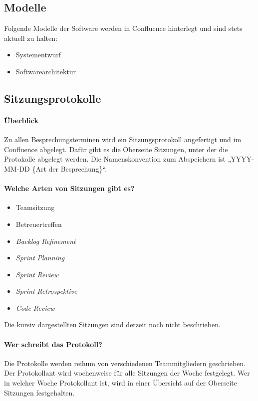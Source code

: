 \subsection{Modelle}
Folgende Modelle der Software werden in Confluence hinterlegt und sind stets aktuell zu halten:
\begin{itemize}
	\item Systementwurf
	\item Softwarearchitektur
\end{itemize}

\subsection{Sitzungsprotokolle}
\paragraph{Überblick}
Zu allen Besprechungsterminen wird ein Sitzungsprotokoll angefertigt und im Confluence abgelegt. Dafür gibt es die Oberseite Sitzungen, unter der die Protokolle abgelegt werden. Die Namenskonvention zum Abspeichern ist „YYYY-MM-DD \{Art der Besprechung\}“.

\paragraph{Welche Arten von Sitzungen gibt es?}
\begin{itemize}
	\item Teamsitzung
	\item Betreuertreffen
	\item \textit{Backlog Refinement}
	\item \textit{Sprint Planning}
	\item \textit{Sprint Review}
	\item \textit{Sprint Retrospektive}
	\item \textit{Code Review}
\end{itemize}
Die kursiv dargestellten Sitzungen sind derzeit noch nicht beschrieben.

\paragraph{Wer schreibt das Protokoll?}
Die Protokolle werden reihum von verschiedenen Teammitgliedern geschrieben. Der Protokollant wird wochenweise für alle Sitzungen der Woche festgelegt. Wer in welcher Woche Protokollant ist, wird in einer Übersicht auf der Oberseite Sitzungen festgehalten.

